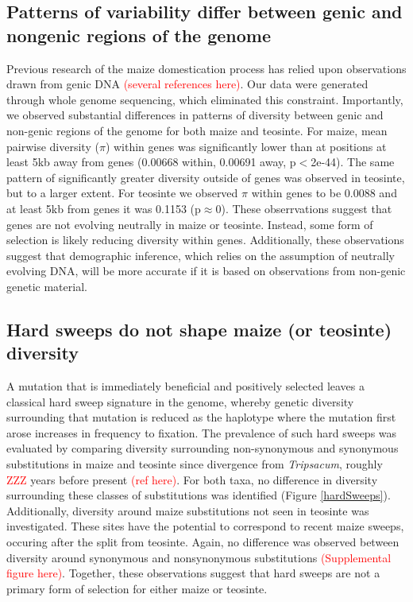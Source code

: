 \documentclass{pnastwo}
\begin{document}
\begin{article}
\subsection{Patterns of variability differ between genic and
  nongenic regions of the genome}
Previous research of the maize domestication process has relied upon
observations drawn from genic DNA \textcolor{red}{(several references
  here)}. Our data were generated through whole genome sequencing,
which eliminated this constraint. Importantly, we observed substantial
differences in patterns of diversity between genic and non-genic regions
of the genome for both maize and teosinte. For maize, mean pairwise
diversity ($\pi$) within genes was significantly lower than at
positions at least 5kb away from genes (0.00668 within, 0.00691 away, p$<$2e-44). The same
pattern of significantly greater diversity outside of genes was observed in
teosinte, but to a larger extent. For teosinte we observed $\pi$
within genes to be 0.0088 and at least 5kb from genes it was 0.1153
(p$\approx$0). These obserrvations suggest that genes are not evolving
neutrally in maize or teosinte. Instead, some form of selection is likely
reducing diversity within genes. Additionally, these observations
suggest that demographic inference, which relies on the assumption of
neutrally evolving DNA, will be more accurate if it is based on
observations from non-genic genetic material.

\subsection{Hard sweeps do not shape maize (or teosinte) diversity}
A mutation that is immediately beneficial and positively selected leaves a classical hard
sweep signature in the genome, whereby genetic diversity surrounding
that mutation is reduced as the haplotype where the mutation first
arose increases in frequency to fixation. The prevalence of such hard
sweeps was evaluated by comparing diversity
surrounding non-synonymous and synonymous substitutions in maize and
teosinte since divergence from \emph{Tripsacum}, roughly \textcolor{red}{ZZZ} years before
present \textcolor{red}{(ref here)}. For both taxa, no difference in diversity
surrounding these classes of substitutions was identified (Figure \ref{hardSweeps}). Additionally, diversity around maize substitutions
not seen in teosinte was investigated. These sites have the
potential to correspond to recent maize sweeps, occuring after the
split from teosinte. Again, no difference was observed
between diversity around synonymous and nonsynonymous
substitutions \textcolor{red}{(Supplemental figure here)}. Together, these observations suggest that hard sweeps
are not a primary form of selection for either maize or teosinte.


\end{article}
\end{document}
